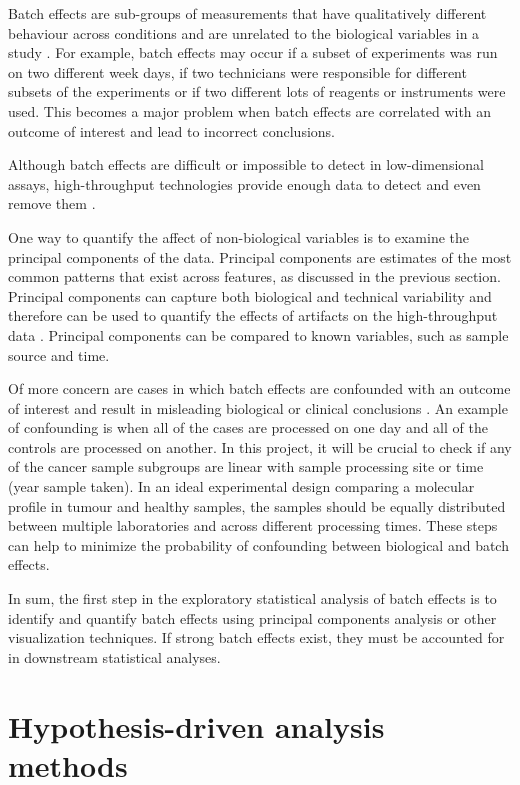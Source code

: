 Batch effects are sub-groups of measurements that have qualitatively different behaviour across conditions and are unrelated to the biological variables in a study \cite{Leek2010}. For example, batch effects may occur if a subset of experiments was run on two different week days, if two technicians were responsible for different subsets of the experiments or if two different lots of reagents or instruments were used. This becomes a major problem when batch effects are correlated with an outcome of interest and lead to incorrect conclusions.
 
Although batch effects are difficult or impossible to detect in low-dimensional assays, high-throughput technologies provide enough data to detect and even remove them \cite{Leek2010}. 
 
One way to quantify the affect of non-biological variables is to examine the principal components of the data. Principal components are estimates of the most common patterns that exist across features, as discussed in the previous section. Principal components can capture both biological and technical variability and therefore can be used to quantify the effects of artifacts on the high-throughput data \cite{LeekCapturingAnalysis}. Principal components can be compared to known variables, such as sample source and time. 
 
Of more concern are cases in which batch effects are confounded with an outcome of interest and result in misleading biological or clinical conclusions \cite{Leek2010}. An example of confounding is when all of the cases are processed on one day and all of the controls are processed on another. In this project, it will be crucial to check if any of the cancer sample subgroups are linear with sample processing site or time (year sample taken). In an ideal experimental design comparing a molecular profile in tumour and healthy samples, the samples should be equally distributed between multiple laboratories and across different processing times. These steps can help to minimize the probability of confounding between biological and batch effects.
 
In sum, the first step in the exploratory statistical analysis of batch effects is to identify and quantify batch effects using principal components analysis or other visualization techniques. If strong batch effects exist, they must be accounted for in downstream statistical analyses. 

 

\newpage
\section{Hypothesis-driven analysis methods}    





